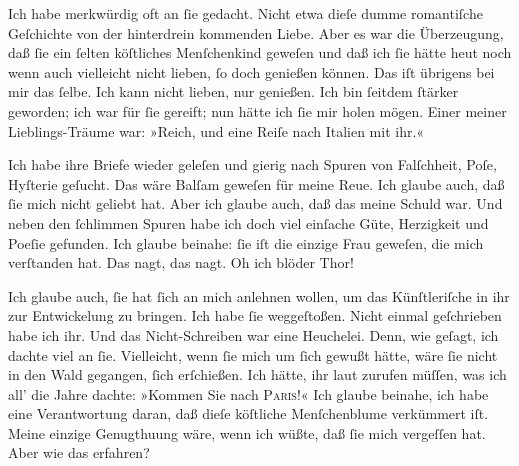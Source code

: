 \pstart
           Ich habe merkwürdig oft an ſie gedacht. Nicht etwa dieſe dumme romantiſche Geſchichte
               von der hinterdrein kommenden Liebe. Aber  es war
               die Überzeugung, daß ſie ein
               ſelten köſtliches Menſchenkind geweſen {\pb}und daß ich ſie hätte
                  heut noch wenn auch vielleicht nicht lieben, ſo
               doch genießen können. Das iſt übrigens bei mir das ſelbe. Ich kann nicht lieben, nur
               genießen. Ich bin ſeitdem ſtärker geworden; ich war für ſie gereift; nun hätte ich
               ſie mir holen mögen. Einer meiner Lieblings-Träume war: »Reich, und eine Reiſe nach
                  Italien mit ihr.«\pend
           
\pstart
           Ich habe ihre Briefe wieder geleſen und gierig nach Spuren von Falſchheit, Poſe,
               Hyſterie geſucht. Das wäre Balſam geweſen für meine Reue. Ich glaube auch, daß ſie
               mich nicht geliebt hat. Aber ich glaube auch, daß das meine Schuld war. Und neben den
                  {\pb}ſchlimmen Spuren habe ich doch viel einſache
               Güte, Herzigkeit und Poeſie gefunden. Ich glaube beinahe: ſie iſt die einzige Frau
               geweſen, die mich \strikeout{\textcolor{gray}{ver}} verſtanden hat. Das nagt, das nagt. Oh ich blöder Thor!\pend
           
\pstart
           Ich glaube auch, ſie hat ſich an mich anlehnen wollen, um das Künſtleriſche in ihr
               zur Entwickelung zu bringen. Ich habe ſie weggeſtoßen. Nicht einmal geſchrieben habe
               ich ihr. Und das Nicht-Schreiben war eine Heuchelei. Denn, wie geſagt, ich dachte
               viel an ſie. Vielleicht, wenn ſie mich um ſich gewußt hätte, wäre ſie nicht in den
               Wald {\pb}gegangen, ſich erſchießen. Ich hätte, ihr laut
               zurufen müſſen, was ich all’ die Jahre dachte: »Kommen Sie nach \textsc{Paris}!« Ich glaube beinahe, ich habe eine Verantwortung daran, daß dieſe köſtliche
                  Menſchenblume verkümmert
               iſt. Meine einzige Genugthuung wäre, wenn ich wüßte, daß ſie mich vergeſſen hat. Aber
               wie das erfahren?\pend
           
